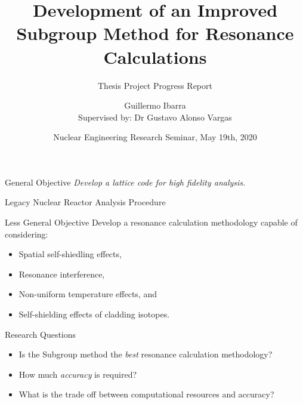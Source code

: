 \documentclass[sans,mathserif,aspectratio=169, 10pt]{beamer}
\title{Development of an Improved Subgroup Method for Resonance Calculations}
\subtitle{Thesis Project Progress Report}
\author[Guillermo Ibarra]{Guillermo Ibarra\\{\small Supervised by: Dr Gustavo Alonso Vargas}}
\date{Nuclear Engineering Research Seminar, May 19th, 2020}
\begin{document}
\begin{frame}
\titlepage
\end{frame}

\begin{frame}{General Objective}
\centering
\LARGE
\emph{\color{steel!115}Develop a lattice code for high fidelity analysis.}
\end{frame}

\begin{frame}{Legacy Nuclear Reactor Analysis Procedure}
\begin{center}
\end{center}
\end{frame}

\begin{frame}{Less General Objective}
Develop a resonance calculation methodology capable of considering:
\begin{itemize}[<+->]
\item Spatial self-shiedling effects,
\item Resonance interference,
\item Non-uniform temperature effects, and
\item Self-shielding effects of cladding isotopes. 
\end{itemize}
\end{frame}

\begin{frame}{Research Questions}
\begin{itemize}[<+->]
\item Is the Subgroup method the \emph{best} resonance calculation methodology?
\item How much \emph{accuracy} is required? 
\item What is the trade off between computational resources and accuracy?
\end{itemize}
\end{frame}
\end{document}
